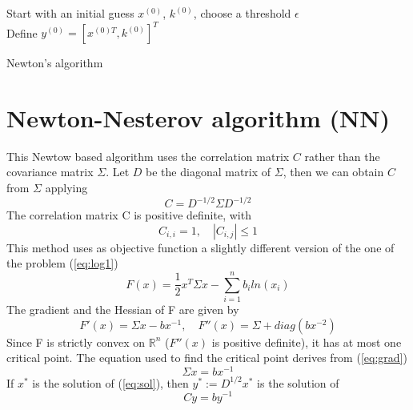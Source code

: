 \begin{algorithm}
Start with an initial guess $x^{(0)}$, $k^{(0)}$, choose a threshold $\epsilon$\\

Define $y^{(0)} = [x^{(0)T}, k^{(0)}]^T$\\

\caption{Newton's algorithm}
\label{alg:newton}
\end{algorithm}


\section{Newton-Nesterov algorithm (NN)}
This Newtow based algorithm uses the correlation matrix $C$ rather than the covariance matrix $\Sigma$. Let $D$ be the diagonal matrix of $\Sigma$, then we can obtain $C$ from $\Sigma$ applying
\begin{equation}
C = D^{-1/2}\Sigma D^{-1/2}
\end{equation}
The correlation matrix C is positive definite, with
\begin{equation}\label{eq:corr}
C_{i,i} = 1, \quad |C_{i,j}| \leq 1 
\end{equation}
This method uses as objective function a slightly different version of the one of the problem (\ref{eq:log1})
\begin{equation}
F(x) = \frac{1}{2} x^T \Sigma x - \sum_{i=1}^n b_i ln(x_i)
\end{equation}
The gradient and the Hessian of F are given by
\begin{equation}\label{eq:grad}
F'(x) = \Sigma x - bx^{-1}, \quad F''(x) = \Sigma + diag(bx^{-2})
\end{equation}
Since F is strictly convex on $\mathbb{R}^n$ ($F''(x)$ is positive definite), it has at most one critical point. The equation used to find the critical point derives from (\ref{eq:grad})
\begin{equation}\label{eq:sol}
\Sigma x = bx^{-1}
\end{equation}
If $x^*$ is the solution of (\ref{eq:sol}), then $y^* := D^{1/2}x^*$ is the solution of
\begin{equation}
Cy = by^{-1}
\end{equation}

